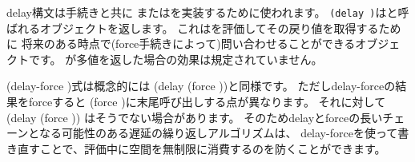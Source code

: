 \begin{entry}{%
}


\semantics
{\cf delay}構文は手続きと共に
またはを実装するために使われます。
{\tt(delay~)}はと呼ばれるオブジェクトを返します。
これはを評価してその戻り値を取得するために
将来のある時点で({\cf force}手続きによって)問い合わせることができるオブジェクトです。
が多値を返した場合の効果は規定されていません。

\end{entry}

\begin{entry}{%
}


\semantics
{\cf (delay-force )}式は概念的には
{\cf (delay (force ))}と同様です。
ただし{\cf delay-force}の結果をforceすると
{\cf (force )}に末尾呼び出しする点が異なります。
それに対して
{\cf (delay (force ))}
はそうでない場合があります。
そのため{\cf delay}と{\cf force}の長いチェーンとなる可能性のある遅延の繰り返しアルゴリズムは、
{\cf delay-force}を使って書き直すことで、評価中に空間を無制限に消費するのを防くことができます。

\end{entry}

